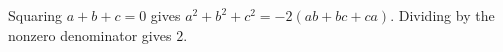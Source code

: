 Squaring $a+b+c=0$ gives $a^2+b^2+c^2=-2(ab+bc+ca)$. Dividing by the nonzero denominator gives $\boxed2$.
